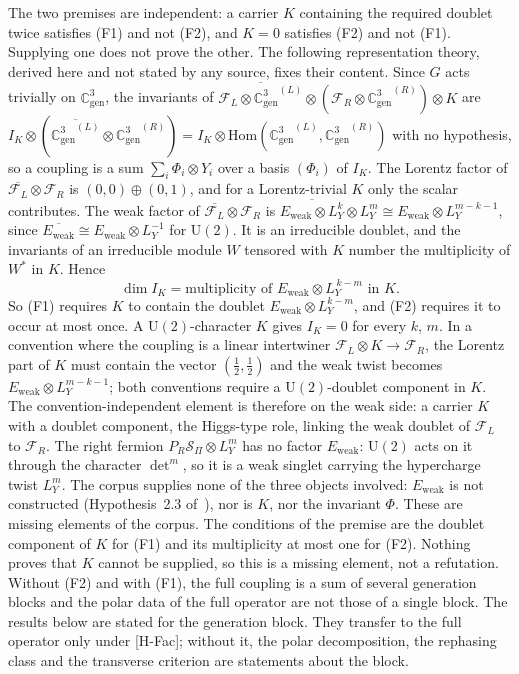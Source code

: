 \documentclass[11pt]{article}
\theoremstyle{definition}
\theoremstyle{remark}
\newcommand{\Cgen}{\mathbb{C}^{3}_{\mathrm{gen}}}
\newcommand{\Sbundle}{\mathcal{S}_{\Pi}}
\newcommand{\Eweak}{E_{\mathrm{weak}}}
\newcommand{\GL}{{\Cgen}^{(L)}}
\newcommand{\GR}{{\Cgen}^{(R)}}
\newcommand{\LY}{L_{Y}}
\newcommand{\UU}{\mathrm{U}}
\begin{document}
    The two premises are independent: a carrier $K$ containing the required doublet twice satisfies (F1) and not (F2),
    and $K = 0$ satisfies (F2) and not (F1).
    Supplying one does not prove the other.
    The following representation theory, derived here and not stated by any source, fixes their content.
    Since $G$ acts trivially on $\Cgen$, the invariants of $\overline{\mathcal{F}_{L} \otimes \GL} \otimes
    (\mathcal{F}_{R} \otimes \GR) \otimes K$ are $I_{K} \otimes (\overline{\GL} \otimes \GR) = I_{K} \otimes
    \mathrm{Hom}(\GL, \GR)$ with no hypothesis, so a coupling is a sum $\sum_{i} \Phi_{i} \otimes Y_{i}$ over a basis
    $(\Phi_{i})$ of $I_{K}$.
    The Lorentz factor of $\overline{\mathcal{F}_{L}} \otimes \mathcal{F}_{R}$ is $(0, 0) \oplus (0, 1)$, and for a
    Lorentz-trivial $K$ only the scalar contributes.
    The weak factor of $\overline{\mathcal{F}_{L}} \otimes \mathcal{F}_{R}$ is
    $\overline{\Eweak \otimes \LY^{k}} \otimes \LY^{m} \cong \Eweak \otimes \LY^{m-k-1}$, since
    $\overline{\Eweak} \cong \Eweak \otimes \LY^{-1}$ for $\UU(2)$.
    It is an irreducible doublet, and the invariants of an irreducible module $W$ tensored with $K$ number the
    multiplicity of $W^{*}$ in $K$.
    Hence
    \[
      \dim I_{K} = \text{multiplicity of } \Eweak \otimes \LY^{\,k-m} \text{ in } K .
    \]
    So (F1) requires $K$ to contain the doublet $\Eweak \otimes \LY^{k-m}$, and (F2) requires it to occur at most
    once.
    A $\UU(2)$-character $K$ gives $I_{K} = 0$ for every $k$, $m$.
    In a convention where the coupling is a linear intertwiner $\mathcal{F}_{L} \otimes K \to \mathcal{F}_{R}$, the
    Lorentz part of $K$ must contain the vector $(\tfrac12, \tfrac12)$ and the weak twist becomes
    $\Eweak \otimes \LY^{m-k-1}$; both conventions require a $\UU(2)$-doublet component in $K$.
    The convention-independent element is therefore on the weak side: a carrier $K$ with a doublet component, the
    Higgs-type role, linking the weak doublet of $\mathcal{F}_{L}$ to $\mathcal{F}_{R}$.
    The right fermion $P_{R}\Sbundle \otimes \LY^{m}$ has no factor $\Eweak$:
    $\UU(2)$ acts on it through the character $\det^{m}$, so it is a weak singlet
    carrying the hypercharge twist $\LY^{m}$.
    The corpus supplies none of the three objects involved: $\Eweak$ is not constructed (Hypothesis~2.3
    of~\cite{Beau2026q14}), nor is $K$, nor the invariant $\Phi$.
    These are missing elements of the corpus.
    The conditions of the premise are the doublet component of $K$ for (F1) and its multiplicity at most one for (F2).
    Nothing proves that $K$ cannot be supplied, so this is a missing element, not a refutation.
    Without (F2) and with (F1), the full coupling is a sum of several generation blocks and the polar data of the
    full operator are not those of a single block.
    The results below are stated for the generation block.
    They transfer to the full operator only under [H-Fac]; without it, the polar decomposition, the rephasing class
    and the transverse criterion are statements about the block.
\end{document}
